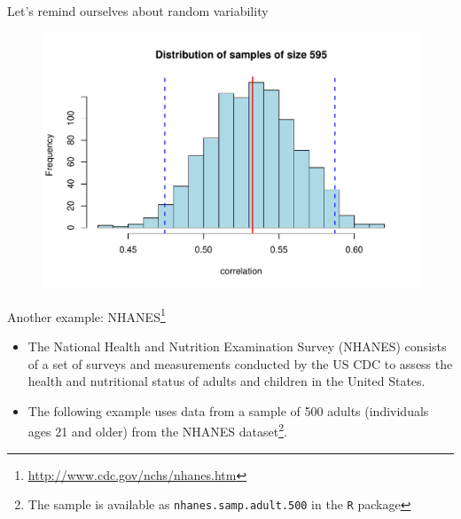 \documentclass[10pt,handout]{beamer}\usepackage[]{graphicx}\usepackage[]{color}
\makeatletter
\def\maxwidth{ %
  \ifdim\Gin@nat@width>\linewidth
    \linewidth
  \else
    \Gin@nat@width
  \fi
}
\newenvironment{knitrout}{}{} %
\makeatother
\begin{document}
\begin{frame}[fragile]{Let's remind ourselves about random variability}
\begin{figure}
\begin{minipage}[h]{0.59\linewidth}
\begin{knitrout}
{\centering \includegraphics[width=\maxwidth]{figure/histboot-1} 

}


\end{knitrout}
	\end{minipage}
\end{figure}



\end{frame}



\begin{frame}{Another example: NHANES\footnote{\tiny{\url{http://www.cdc.gov/nchs/nhanes.htm}}}}
	\begin{itemize}
		\item The National Health and Nutrition Examination Survey (NHANES) consists of a set of surveys and measurements conducted by the US CDC to assess the health and nutritional status of adults	and children in the United States. 
		\item The following example uses data from a sample of 500 adults (individuals ages 21 and older) from the NHANES dataset\footnote{\tiny{The sample is available as \texttt{nhanes.samp.adult.500} in the \texttt{R}  package}}.
	\end{itemize}
\end{frame}
\end{document}
